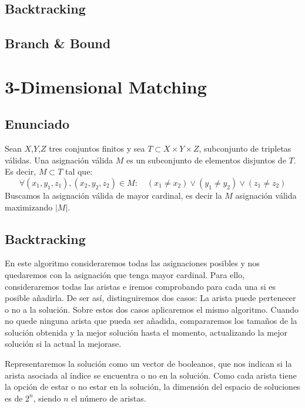 \documentclass[a4paper, 11pt]{article} %
\begin{document}
  
  \subsection{Backtracking}
  
  \subsection{Branch \& Bound}

\section{3-Dimensional Matching}
  \subsection{Enunciado}
    Sean $X$,$Y$,$Z$ tres conjuntos finitos y sea $T \subset X \times Y \times Z$, subconjunto de tripletas válidas.
    Una asignación válida $M$ es un subconjunto de elementos disjuntos de $T$. Es decir, $M \subset T$ tal que:
    \begin{equation}
     \forall (x_1,y_1,z_1), (x_2,y_2,z_2) \in M : \quad (x_1 \neq x_2) \vee (y_1 \neq y_2) \vee (z_1 \neq z_2)
    \end{equation} 
    Buscamos la asignación válida de mayor cardinal, es decir la $M$ asignación válida maximizando $|M|$.
    
  \subsection{Backtracking}
  En este algoritmo consideraremos todas las asignaciones posibles y nos quedaremos con la asignación que tenga mayor cardinal. 
  Para ello, consideraremos todas las aristas e iremos comprobando para cada una si es posible añadirla. De ser así, distinguiremos 
  dos casos: La arista puede pertenecer o no a la solución. Sobre estos dos casos aplicaremos el mismo algoritmo. Cuando no quede
  ninguna arista que pueda ser añadida, compararemos los tamaños de la solución obtenida y la mejor solución hasta el momento, 
  actualizando la mejor solución si la actual la mejorase. 
  
  Representaremos la solución como un vector de booleanos, que nos indican si la arista asociada al índice se encuentra o 
  no en la solución. Como cada arista tiene la opción de estar o no estar en la solución, la dimensión del espacio de 
  soluciones es de $2^n$, siendo $n$ el número de aristas.
  
\end{document}
